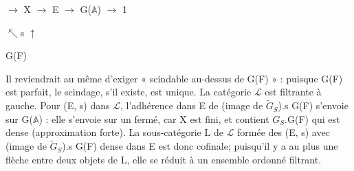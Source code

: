\documentclass[10pt,a4paper]{article}
\begin{document}
\smallskip
{} \ensuremath{→} X \ensuremath{→} E \ensuremath{→} G(\ensuremath{𝔸}) \ensuremath{→} 1\par
\noindent           \ensuremath{↖}s    \ensuremath{↑}\par
\noindent              G(F)\par
\smallskip
\noindent Il reviendrait au même d'exiger « scindable au-dessus de G(F) » : puisque G(F) est parfait, le scindage, s'il existe, est unique. La catégorie \ensuremath{ℒ} est filtrante à gauche. Pour (E, s) dans \ensuremath{ℒ}, l'adhérence dans E de (image de \ensuremath{\widetilde{G}_S}).s G(F) s'envoie sur G(\ensuremath{𝔸}) : elle s'envoie sur un fermé, car X est fini, et contient \ensuremath{G_S}.G(F) qui est dense (approximation forte). La sous-catégorie L de \ensuremath{ℒ} formée des (E, s) avec (image de \ensuremath{\widetilde{G}_S}).s G(F) dense dans E est donc cofinale; puisqu'il y a au plus une flèche entre deux objets de L, elle se réduit à un ensemble ordonné filtrant.\par
\clearpage
{}\hypertarget{authority-page-0003}{}
\end{document}
